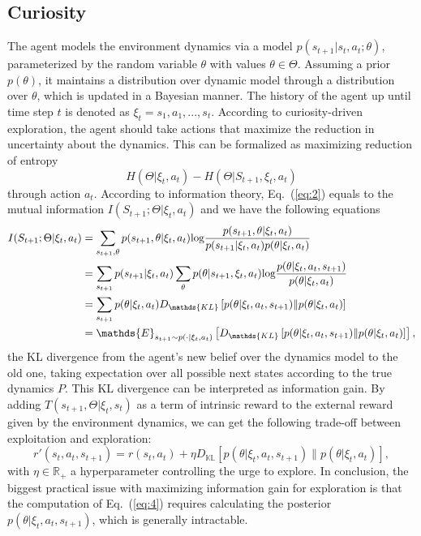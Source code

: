 \documentclass{article}
\begin{document}
	\subsection{Curiosity}
	\noindent The agent models the environment dynamics via a model $p(s_{t+1}|s_t,a_t;\theta)$, parameterized by the random variable $\theta$ with values $\theta \in \Theta$. Assuming a prior $p(\theta)$, it maintains a distribution over dynamic model through a distribution over $\theta$, which is updated in a Bayesian manner. The history of the agent up until time step $t$ is denoted as $\xi_t = {s_1,a_1,...,s_t}$. According to curiosity-driven exploration, the agent should take actions that maximize the reduction in uncertainty about the dynamics. This can be formalized as maximizing reduction of entropy
	\begin{equation}
	H(\Theta|\xi_t,a_t) - H(\Theta|S_{t+1},\xi_t,a_t)\label{eq:2}
	\end{equation}
	through action $a_t$. According to information theory, Eq.~(\ref{eq:2}) equals to the mutual information $I(S_{t+1};\Theta|\xi_t,a_t)$ and we have the following equations
	\begin{align}
	I(S_{t+1};\Theta|\xi_t,a_t) &= \sum_{s_{t+1},\theta}p(s_{t+1},\theta|\xi_t,a_t)\text{log}\frac{p(s_{t+1},\theta|\xi_t,a_t)}{p(s_{t+1}|\xi_t,a_t)p(\theta|\xi_t,a_t)}\notag\\ &=\sum_{s_{t+1}}p(s_{t+1}|\xi_t,a_t)\sum_{\theta}p(\theta|s_{t+1},\xi_t,a_t)\text{log}\frac{p(\theta|\xi_t,a_t,s_{t+1})}{p(\theta|\xi_t,a_t)}\notag\\
	&= \sum_{s_{t+1}}p(\theta|\xi_t,a_t)D_\mathds{KL}\left[p(\theta|\xi_t,a_t,s_{t+1})\|p(\theta|\xi_t,a_t)\right]\notag\\
	&= \mathds{E}_{s_{t+1}\sim p(\cdot|\xi_t,a_t)}\left[D_\mathds{KL}\left[p(\theta|\xi_t,a_t,s_{t+1})\|p(\theta|\xi_t,a_t)\right]\right],\label{eq:3}
	\end{align}
	the KL divergence from the agent's new belief over the dynamics model to the old one, taking expectation over all possible next states according to the true dynamics $P$. This KL divergence can be interpreted as information gain.
	By adding $T(s_{t+1},\Theta|\xi_t,s_t)$ as a term of intrinsic reward to the external reward given by the environment dynamics, we can get the following trade-off between exploitation and exploration:
	\begin{equation}
	r'(s_t,a_t,s_{t+1}) = r(s_t,a_t) + \eta D_\mathds{KL}\left[p(\theta|\xi_t,a_t,s_{t+1})\|p(\theta|\xi_t,a_t)\right]\label{eq:4},
	\end{equation} 
	with $\eta\in\mathds{R}_+$ a hyperparameter controlling the urge to explore. In conclusion, the biggest practical issue with maximizing information gain for exploration is that the computation of Eq.~(\ref{eq:4}) requires calculating the posterior $p(\theta|\xi_t,a_t,s_{t+1})$, which is generally intractable.
\end{document}
